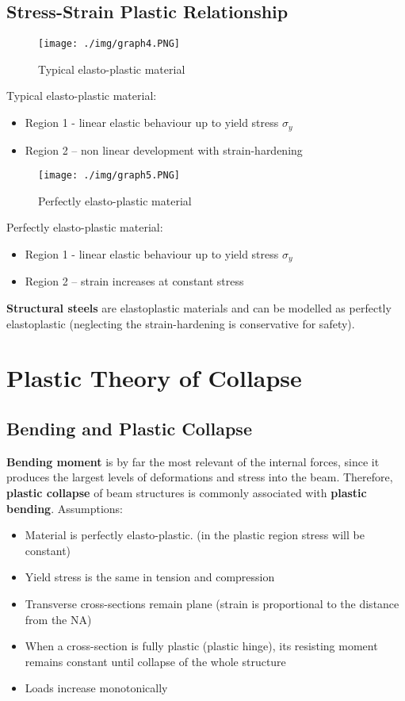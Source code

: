 \subsection{Stress-Strain Plastic Relationship}
\begin{figure}[H]
  \centering
  \texttt{[image: ./img/graph4.PNG]}
  \caption{Typical elasto-plastic material}
\end{figure}
Typical elasto-plastic material:
\begin{itemize}
  \item Region 1 - linear elastic behaviour up to yield stress $\sigma_y$
  \item Region 2 – non linear development with strain-hardening
\end{itemize}
\begin{figure}[H]
  \centering
  \texttt{[image: ./img/graph5.PNG]}
  \caption{Perfectly elasto-plastic material}
\end{figure}
Perfectly elasto-plastic material:
\begin{itemize}
  \item Region 1 - linear elastic behaviour up to yield stress $\sigma_y$
  \item Region 2 – strain increases at constant stress
\end{itemize}
\textbf{Structural steels} are elastoplastic materials and can be modelled as perfectly elastoplastic (neglecting the strain-hardening is conservative for safety).
\section{Plastic Theory of Collapse}
\subsection{Bending and Plastic Collapse}
\textbf{Bending moment} is by far the most relevant of the internal forces, since it produces the largest levels of deformations and stress into the beam. Therefore, \textbf{plastic collapse} of beam structures is commonly associated with \textbf{plastic bending}.
Assumptions:
\begin{itemize}
  \item Material is perfectly elasto-plastic. (in the plastic region stress will be constant)
  \item Yield stress is the same in tension and compression
  \item Transverse cross-sections remain plane (strain is proportional to the distance from the NA)
  \item When a cross-section is fully plastic (plastic hinge), its resisting moment remains constant until collapse of the whole structure
  \item Loads increase monotonically
\end{itemize}
